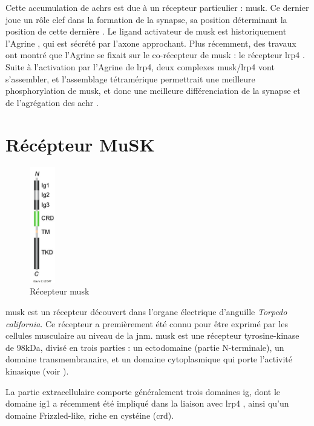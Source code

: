 	Cette accumulation de \glspl{achr} est due à un récepteur particulier : \gls{musk}. Ce dernier joue un rôle clef dans la formation de la synapse, sa position déterminant la position de cette dernière \cite{DeChiara1996, Glass1996}. Le ligand activateur de \gls{musk} est historiquement l'Agrine \cite{Glass1996}, qui est sécrété par l'axone approchant. Plus récemment, des travaux ont montré que l'Agrine se fixait sur le co-récepteur de \gls{musk} : le récepteur \gls{lrp4} \cite{Zhang2008, Kim2008}. Suite à l'activation par l'Agrine de \gls{lrp4}, deux complexes \gls{musk}/\gls{lrp4} vont s'assembler, et l'assemblage tétramérique permettrait une meilleure phosphorylation de \gls{musk}, et donc une meilleure différenciation de la synapse et de l'agrégation des \gls{achr} \cite{Zong2012}.
	
\section{Récépteur MuSK}
	\label{sec:IntroMuSK}
	
	\begin{figure}
		\includegraphics[width=0.1\textwidth]{./Images/MuSKReceptor.png}	
		\caption{Récepteur \gls{musk}}
		\label{fig:RMuSK}
	\end{figure}

	\gls{musk} est un récepteur découvert dans l'organe électrique d'anguille \emph{Torpedo california}. Ce récepteur a premièrement été connu pour être exprimé par les cellules musculaire au niveau de la \gls{jnm}. \gls{musk} est une récepteur tyrosine-kinase de 98kDa, divisé en trois parties : un ectodomaine (partie N-terminale), un domaine transmembranaire, et un domaine cytoplasmique qui porte l'activité kinasique (voir ). 
	
	La partie extracellulaire comporte généralement trois domaines \gls{ig}, dont le domaine \gls{ig}1 a récemment été impliqué dans la liaison avec \gls{lrp4} \cite{Zhang2011}, ainsi qu'un domaine Frizzled-like, riche en cystéine (\gls{crd}).
	
